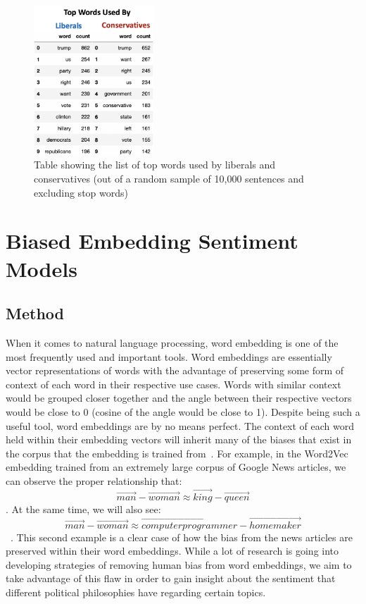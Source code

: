 \documentclass[conference]{IEEEtran}
\begin{document}
\begin{figure}[tb]
    \centering
    \includegraphics[width=0.4\textwidth]{EDA2.pdf}
    \vspace{-2mm}
    \caption{Table showing the list of top words used by liberals and conservatives (out of a random sample of 10,000 sentences and excluding stop words)}
    \label{fig:EDA2}
    \vspace{-5mm}
\end{figure}

\section{Biased Embedding Sentiment Models}
\subsection{Method}
When it comes to natural language processing, word embedding is one of the most frequently used and important tools. Word embeddings are essentially vector representations of words with the advantage of preserving some form of context of each word in their respective use cases. Words with similar context would be grouped closer together and the angle between their respective vectors would be close to 0 (cosine of the angle would be close to 1).  Despite being such a useful tool, word embeddings are by no means perfect. The context of each word held within their embedding vectors will inherit many of the biases that exist in the corpus that the embedding is trained from~\cite{bolukbasi2016man}. For example, in the Word2Vec embedding trained from an extremely large corpus of Google News articles, we can observe the proper relationship that: $$\vec{man}-\vec{woman}\approx\vec{king}-\vec{queen}$$. At the same time, we will also see: $$\vec{man}-\vec{woman}\approx\vec{computer programmer}-\vec{homemaker}$$~\cite{bolukbasi2016man}. This second example is a clear case of how the bias from the news articles are preserved within their word embeddings.  While a lot of research is going into developing strategies of removing human bias from word embeddings, we aim to take advantage of this flaw in order to gain insight about the sentiment that different political philosophies have regarding certain topics.
 
\end{document}
